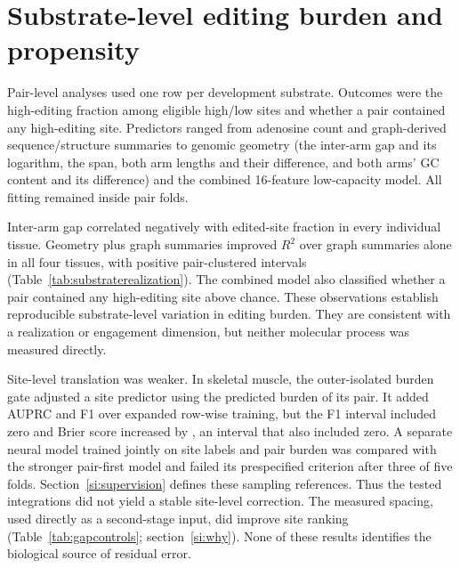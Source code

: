 \documentclass[9pt,twoside]{pnas-new}
\begin{document}
\section{Substrate-level editing burden and propensity}\label{si:burden}

Pair-level analyses used one row per development substrate. Outcomes were the high-editing fraction among eligible high/low sites and whether a pair contained any high-editing site. Predictors ranged from adenosine count and graph-derived sequence/structure summaries to genomic geometry (the inter-arm gap and its logarithm, the span, both arm lengths and their difference, and both arms' GC content and its difference) and the combined 16-feature low-capacity model. All fitting remained inside pair folds.

Inter-arm gap correlated negatively with edited-site fraction in every individual tissue. Geometry plus graph summaries improved $R^2$ over graph summaries alone in all four tissues, with positive pair-clustered intervals (Table~\ref{tab:substraterealization}). The combined model also classified whether a pair contained any high-editing site above chance. These observations establish reproducible substrate-level variation in editing burden. They are consistent with a realization or engagement dimension, but neither molecular process was measured directly.

Site-level translation was weaker. In skeletal muscle, the outer-isolated burden gate adjusted a site predictor using the predicted burden of its pair. It added \EngagementGateDeltaAUPRCMedian{} AUPRC and \EngagementGateDeltaFOneMedian{} F1 over expanded row-wise training, but the F1 interval included zero and Brier score increased by \EngagementGateDeltaBrierMedian{}, an interval that also included zero. A separate neural model trained jointly on site labels and pair burden was compared with the stronger pair-first model and failed its prespecified criterion after three of five folds. Section~\ref{si:supervision} defines these sampling references. Thus the tested integrations did not yield a stable site-level correction. The measured spacing, used directly as a second-stage input, did improve site ranking (Table~\ref{tab:gapcontrols}; section~\ref{si:why}). None of these results identifies the biological source of residual error.






\end{document}
